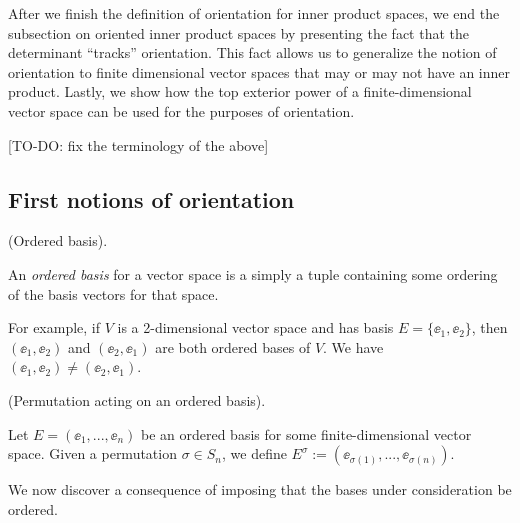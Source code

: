 After we finish the definition of orientation for inner product spaces, we end the subsection on oriented inner product spaces by presenting the fact that the determinant ``tracks'' orientation. This fact allows us to generalize the notion of orientation to finite dimensional vector spaces that may or may not have an inner product. Lastly, we show how the top exterior power of a finite-dimensional vector space can be used for the purposes of orientation.

[TO-DO: fix the terminology of the above]

\subsection*{First notions of orientation}

\begin{defn}
    (Ordered basis).
    
    An \textit{ordered basis} for a vector space is a simply a tuple containing some ordering of the basis vectors for that space.
    
    For example, if $V$ is a 2-dimensional vector space and has basis $E = \{\ee_1, \ee_2\}$, then $(\ee_1, \ee_2)$ and $(\ee_2, \ee_1)$ are both ordered bases of $V$. We have $(\ee_1, \ee_2) \neq (\ee_2, \ee_1)$.
\end{defn}

\begin{defn}
    (Permutation acting on an ordered basis). 
    
    Let $E = (\ee_1, ..., \ee_n)$ be an ordered basis for some finite-dimensional vector space. Given a permutation $\sigma \in S_n$, we define $E^\sigma := (\ee_{\sigma(1)}, ..., \ee_{\sigma(n)})$.
\end{defn}

We now discover a consequence of imposing that the bases under consideration be ordered.

